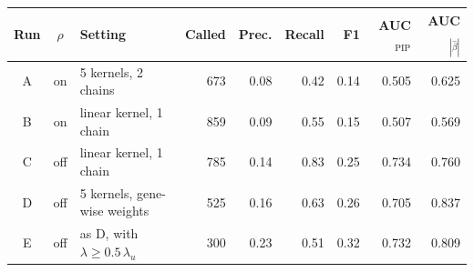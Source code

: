 \begin{tabular}{c c l r r r r r r}
\toprule
Run & $\rho$ & Setting & Called & Prec. & Recall & F1 & AUC$_{\mathrm{PIP}}$ & AUC$_{|\hat\beta|}$ \\
\midrule
A & on & 5 kernels, 2 chains & 673 & 0.08 & 0.42 & 0.14 & 0.505 & 0.625 \\
B & on & linear kernel, 1 chain & 859 & 0.09 & 0.55 & 0.15 & 0.507 & 0.569 \\
C & off & linear kernel, 1 chain & 785 & 0.14 & 0.83 & 0.25 & 0.734 & 0.760 \\
D & off & 5 kernels, gene-wise weights & 525 & 0.16 & 0.63 & 0.26 & 0.705 & 0.837 \\
E & off & as D, with $\lambda \geq 0.5\,\lambda_u$ & 300 & 0.23 & 0.51 & 0.32 & 0.732 & 0.809 \\
\bottomrule
\end{tabular}
